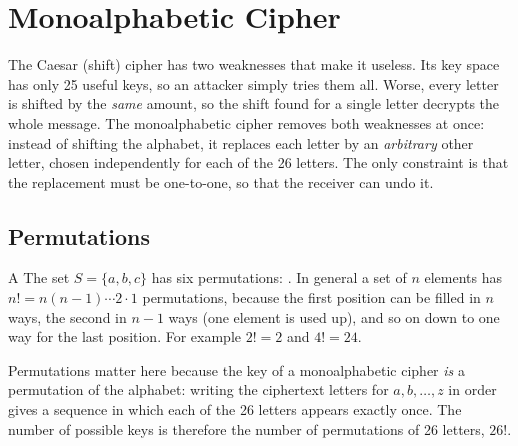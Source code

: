 \providecommand{\NESOACADEMY}{{N,E,S,O,A},{C,D,M,Y,B},{F,G,H,{I/J},K},{L,P,Q,R,T},{U,V,W,X,Z}}
\providecommand{\JUPITER}{{{I/J},U,P,T,E},{R,A,B,C,D},{F,G,H,K,L},{M,N,O,Q,S},{V,W,X,Y,Z}}
\providecommand{\NESOAPP}{{N,E,S,O,A},{P,B,C,D,F},{G,H,{I/J},K,L},{M,Q,R,T,U},{V,W,X,Y,Z}}
\providecommand{\PFFOROUZAN}{{L,G,D,B,A},{Q,M,H,E,C},{U,R,N,{I/J},F},{X,V,S,O,K},{Z,Y,W,T,P}}

\section{Monoalphabetic Cipher}\label{sec:monoalpha}

The Caesar (shift) cipher has two weaknesses that make it useless. Its key space has only 25 useful keys, so an attacker simply tries them all. Worse, every letter is shifted by the \emph{same} amount, so the shift found for a single letter decrypts the whole message. The monoalphabetic cipher removes both weaknesses at once: instead of shifting the alphabet, it replaces each letter by an \emph{arbitrary} other letter, chosen independently for each of the 26 letters. The only constraint is that the replacement must be one-to-one, so that the receiver can undo it.

\subsection{Permutations}
A  The set $S = \{a, b, c\}$ has six permutations: . In general a set of $n$ elements has $n! = n(n-1)\cdots 2 \cdot 1$ permutations, because the first position can be filled in $n$ ways, the second in $n - 1$ ways (one element is used up), and so on down to one way for the last position. For example $2! = 2$ and $4! = 24$.

Permutations matter here because the key of a monoalphabetic cipher \emph{is} a permutation of the alphabet: writing the ciphertext letters for $a, b, \dots, z$ in order gives a sequence in which each of the 26 letters appears exactly once. The number of possible keys is therefore the number of permutations of 26 letters, $26!$.

